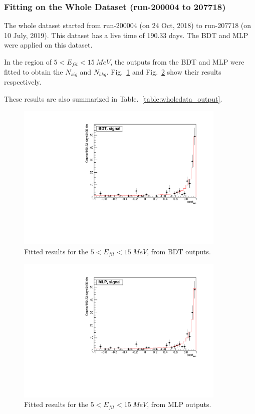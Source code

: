 \subsubsection{Fitting on the Whole Dataset (run-200004 to 207718)}
The whole dataset started from run-200004 (on 24 Oct, 2018) to run-207718 (on 10 July, 2019). This dataset has a live time of 190.33 days. The BDT and MLP were applied on this dataset.

In the region of $5<E_{fit}<15~MeV$, the outputs from the BDT and MLP were fitted to obtain the $N_{sig}$ and $N_{bkg}$. Fig.~\ref{wholeDataset_poissonFit_bdt} and Fig.~\ref{wholeDataset_poissonFit_mlp} show their results respectively.

These results are also summarized in Table.~\ref{table:wholedata_output}.

\begin{figure}[!htb]
	\centering
	\includegraphics[width=10cm]{wholedataFit_bdt.pdf}
	\caption{Fitted results for the $5<E_{fit}<15~MeV$, from BDT outputs.} \label{wholeDataset_poissonFit_bdt}
\end{figure} 

\begin{figure}[!htb]
	\centering
	\includegraphics[width=10cm]{wholedataFit_mlp.pdf}
	\caption{Fitted results for the $5<E_{fit}<15~MeV$, from MLP outputs.}
	\label{wholeDataset_poissonFit_mlp}
\end{figure} 

